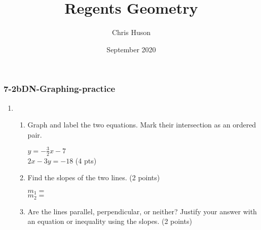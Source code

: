 \documentclass[12pt, twoside]{article}
\title{Regents Geometry}
\author{Chris Huson}
\date{September 2020}
\begin{document}
\subsubsection*{7-2bDN-Graphing-practice}
\begin{enumerate}
\item \begin{enumerate}
    \item Graph and label the two equations. Mark their intersection as an ordered pair.
      \begin{multicols}{2}
        $y =-\frac{3}{2}x-7$ \\
        $2x-3y=-18$ \hfill (4 pts)
      \end{multicols}     \vspace{1.5cm}
    \item Find the slopes of the two lines. \hfill (2 points)
      \begin{multicols}{2}
        $m_1=$ \\
        $m_2=$
      \end{multicols}
    \item Are the lines parallel, perpendicular, or neither? Justify your answer with an equation or inequality using the slopes. \hfill (2 points)
    \vspace{1.5cm}
  \end{enumerate}
    \begin{center}
    \end{center}


\end{enumerate}
\end{document}
